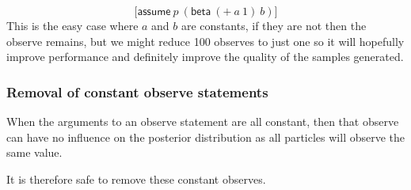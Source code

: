 \documentclass[a4paper]{article}
\begin{document}
\[\lbrack \mathsf{assume}\ p\ (\mathsf{beta}\ (+\ a\ 1)\ b) \rbrack\]
This is the easy case where \(a\) and \(b\) are constants, if they are not then the observe remains, but we might reduce 100 observes to just one so it will hopefully improve performance and definitely improve the quality of the samples generated.




\subsubsection{Removal of constant observe statements}

When the arguments to an observe statement are all constant, then that observe can have no influence on the posterior distribution as all particles will observe the same value.

It is therefore safe to remove these constant observes.
\end{document}
